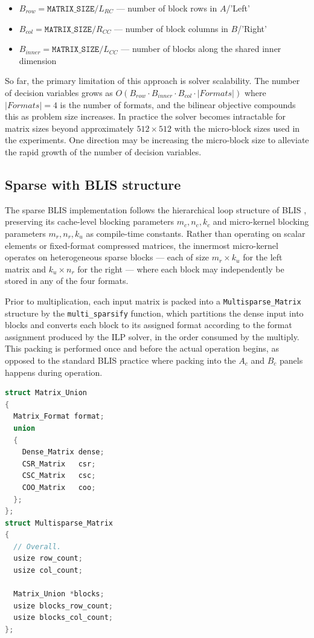 \begin{itemize}
    \item $B_{row} = \texttt{MATRIX\_SIZE} / L_{RC}$ --- number of block rows in $A$/'Left'
    \item $B_{col} = \texttt{MATRIX\_SIZE} / R_{CC}$ --- number of block columns in $B$/'Right'
    \item $B_{inner} = \texttt{MATRIX\_SIZE} / L_{CC}$ --- number of blocks along the shared inner dimension
\end{itemize}

So far, the primary limitation of this approach is solver scalability. The number of decision
variables grows as $O(B_{row} \cdot B_{inner} \cdot B_{col} \cdot |Formats|)$
where $|Formats| = 4$ is the number of
formats, and the bilinear objective compounds this as problem size increases. In
practice the solver becomes intractable for matrix sizes beyond approximately
$512 \times 512$ with the micro-block sizes used in the experiments. One direction may be
increasing the micro-block size to alleviate the rapid growth of the
number of decision variables.

\subsection{Sparse with BLIS structure}

The sparse BLIS implementation follows the hierarchical loop
structure of BLIS \cite{blis},
preserving its cache-level blocking parameters $m_c, n_c, k_c$ and micro-kernel blocking
parameters $m_r, n_r, k_u$ as compile-time constants. Rather than operating on scalar
elements or fixed-format compressed matrices, the innermost micro-kernel operates on
heterogeneous sparse blocks — each of size $m_r \times k_u$ for the left matrix and
$k_u \times n_r$ for the right — where each block may independently be stored in any
of the four formats.

Prior to multiplication, each input matrix is packed into a \texttt{Multisparse\_Matrix}
structure by the \texttt{multi\_sparsify} function, which partitions the dense input into
blocks and converts each block to its assigned format according to the format assignment
produced by the ILP solver, in the order consumed by the multiply.
This packing is performed once and before the actual operation begins, as opposed
to the standard BLIS practice where packing into the $A_c$ and $B_c$ panels happens
during operation.

\begin{lstlisting}[float, language=C, caption={Multisparse Matrix struct}]
struct Matrix_Union
{
  Matrix_Format format;
  union
  {
    Dense_Matrix dense;
    CSR_Matrix   csr;
    CSC_Matrix   csc;
    COO_Matrix   coo;
  };
};
struct Multisparse_Matrix
{
  // Overall.
  usize row_count;
  usize col_count;

  Matrix_Union *blocks;
  usize blocks_row_count;
  usize blocks_col_count;
};
\end{lstlisting}

